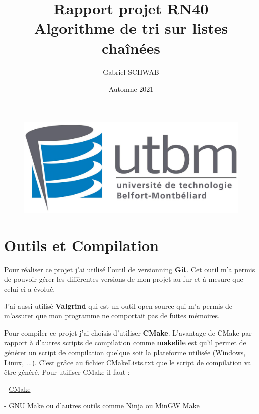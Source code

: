 \documentclass{article}
\begin{document}
\hypersetup{pdfborder=0 0 0}

\title{{Rapport projet RN40} \\ 
[0.3em] 
\Large Algorithme de tri sur listes chaînées}

\author{Gabriel SCHWAB} 
\date{Automne 2021}


\maketitle
\vspace*{4cm}

\begin{figure}[h] 
    \center 
    \includegraphics[scale=0.5]{utbm_forword-2.jpg} 
\end{figure}
\newpage
\tableofcontents
\newpage
\section{Outils et Compilation}

Pour réaliser ce projet j'ai utilisé l'outil de versionning \textbf{Git}. Cet outil m'a permis de pouvoir gérer les différentes versions de mon projet au fur et à mesure que celui-ci a évolué. 

J'ai aussi utilisé \textbf{Valgrind} qui est un outil open-source qui m'a permis de m'assurer que mon programme ne comportait pas de fuites mémoires.

Pour compiler ce projet j'ai choisis d'utiliser \textbf{CMake}. L'avantage de CMake par rapport à d'autres scripts de compilation comme \textbf{makefile} est qu'il permet de générer un script de compilation quelque soit la plateforme utilisée (Windows, Linux, ...). C'est grâce au fichier CMakeLists.txt que le script de compilation va être généré.
Pour utiliser CMake il faut :

- \href{https://cmake.org/download/}{CMake} 

- \href{https://www.gnu.org/software/make/}{GNU Make} ou d'autres outils comme Ninja ou MinGW Make
\end{document}
